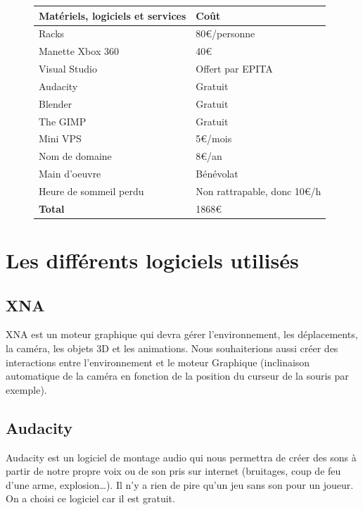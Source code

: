 \documentclass[a4paper, 11pt]{report}
\begin{document}
\begin{figure}[htbp]
\centering
\begin{tabular}{ | l | l | }
\hline \textbf{Matériels, logiciels et services} & \textbf{Coût} \\
\hline Racks & 80€/personne \\
\hline Manette Xbox 360 & 40€ \\
\hline Visual Studio & Offert par EPITA \\
\hline Audacity & Gratuit \\
\hline Blender & Gratuit \\
\hline The GIMP & Gratuit \\
\hline Mini VPS & 5€/mois \\
\hline Nom de domaine & 8€/an \\
\hline Main d'oeuvre & Bénévolat \\
\hline Heure de sommeil perdu & Non rattrapable, donc 10€/h \\
\hline \textbf{Total} & 1868€ \\
\hline 
\end{tabular}
\end{figure}

\newpage
\section{Les différents logiciels utilisés}\label{les-diffuxe9rents-logiciels-utilisuxe9s}

\subsection{XNA}\label{xna}

XNA est un moteur graphique qui devra gérer l'environnement, les déplacements, la caméra, les objets 3D et les animations. Nous souhaiterions aussi créer des interactions entre l'environnement et le moteur Graphique (inclinaison automatique de la caméra en fonction de la position du curseur de la souris par exemple).

\subsection{Audacity}\label{audacity}

Audacity est un logiciel de montage audio qui nous permettra de créer des sons à partir de notre propre voix ou de son pris sur internet (bruitages, coup de feu d'une arme, explosion\ldots{}). Il n'y a rien de pire qu'un jeu sans son pour un joueur. On a choisi ce logiciel car il est gratuit.
\end{document}
